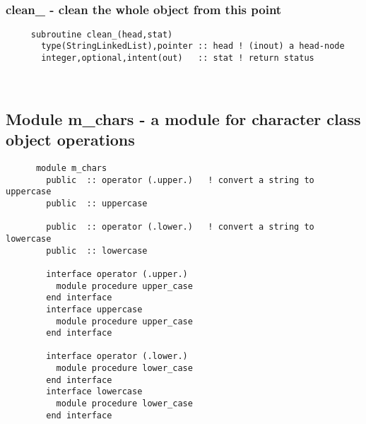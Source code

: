  
\mbox{}\hrulefill\ 
 

  \subsubsection{clean\_ - clean the whole object from this point}

\begin{verbatim} 
     subroutine clean_(head,stat)
       type(StringLinkedList),pointer :: head ! (inout) a head-node
       integer,optional,intent(out)   :: stat ! return status
 \end{verbatim}%


 
 
\mbox{}\hrulefill\ 
 

  \subsection{Module m\_chars - a module for character class object operations }

\begin{verbatim} 
      module m_chars
        public	:: operator (.upper.)	! convert a string to uppercase
        public	:: uppercase
 
        public	:: operator (.lower.)	! convert a string to lowercase
        public	:: lowercase
 
        interface operator (.upper.)
          module procedure upper_case
        end interface
        interface uppercase
          module procedure upper_case
        end interface
 
        interface operator (.lower.)
          module procedure lower_case
        end interface
        interface lowercase
          module procedure lower_case
        end interface
 \end{verbatim}%
 
